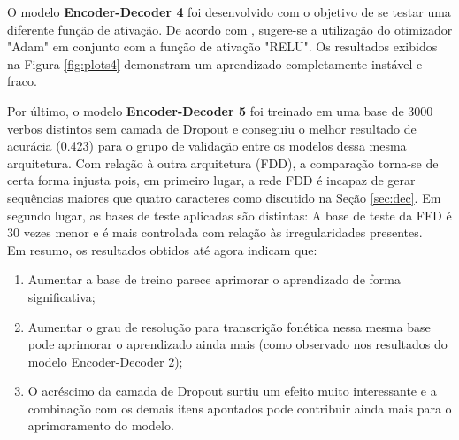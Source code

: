 O modelo \textbf{Encoder-Decoder 4} foi desenvolvido com o objetivo de se testar uma diferente função de ativação. De acordo com %
, sugere-se a utilização do otimizador "Adam" em conjunto com a função de ativação "RELU". Os resultados exibidos na Figura \ref{fig:plots4} demonstram um aprendizado completamente instável e fraco. 

Por último, o modelo \textbf{Encoder-Decoder 5} foi treinado em uma base de 3000 verbos distintos sem camada de Dropout e conseguiu o melhor resultado de acurácia (0.423) para o grupo de validação entre os modelos dessa mesma arquitetura. Com relação à outra arquitetura (FDD), a comparação torna-se de certa forma injusta pois, em primeiro lugar, a rede FDD é incapaz de gerar sequências maiores que quatro caracteres como discutido na Seção \ref{sec:dec}. Em segundo lugar, as bases de teste aplicadas são distintas: A base de teste da FFD é 30 vezes menor e é mais controlada com relação às irregularidades presentes.\\

Em resumo, os resultados obtidos até agora indicam que: 

\begin{enumerate}
\item Aumentar a base de treino parece aprimorar o aprendizado de forma significativa;
\item Aumentar o grau de resolução para transcrição fonética nessa mesma base pode aprimorar o aprendizado ainda mais (como observado nos resultados do modelo Encoder-Decoder 2);
\item O acréscimo da camada de Dropout surtiu um efeito muito interessante e a combinação com os demais itens apontados pode contribuir ainda mais para o aprimoramento do modelo.
\end{enumerate}


